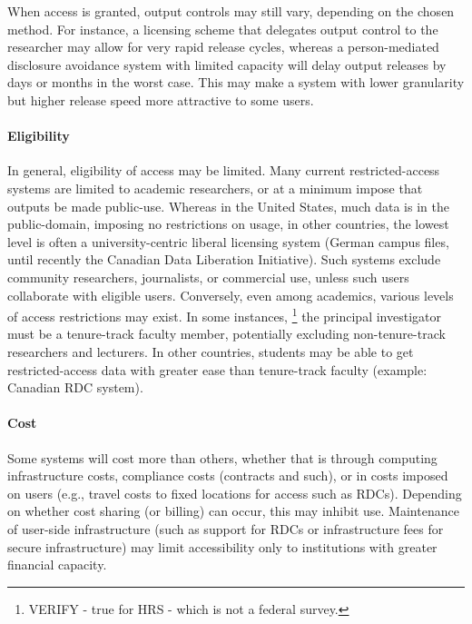 When access is granted, output controls may still vary, depending on the chosen method. For instance, a licensing scheme that delegates output control to the researcher may allow for very rapid release cycles, whereas a person-mediated disclosure avoidance system with limited capacity will delay output releases by days or months in the worst case. This may make a system with lower granularity but higher release speed more attractive to some users. 


\paragraph{Eligibility}

In general, eligibility of access may be limited. Many current restricted-access systems are limited to academic researchers, or at a minimum impose that outputs be made public-use. Whereas in the United States, much data is in the public-domain, imposing no restrictions on usage, in other countries, the lowest level is often a university-centric liberal licensing system (German campus files, until recently the Canadian Data Liberation Initiative). Such systems exclude community researchers, journalists, or commercial use, unless such users collaborate with eligible users. Conversely, even among academics, various levels of access restrictions may exist. In some instances, \footnote{VERIFY - true for HRS - which is not a federal survey.} the principal investigator must be a tenure-track faculty member, potentially excluding non-tenure-track researchers and lecturers. In other countries, students may be able to get restricted-access data with greater ease than tenure-track faculty (example: Canadian RDC system).

\paragraph{Cost}

Some systems will cost more than others, whether that is through computing infrastructure costs, compliance costs (contracts and such), or in costs imposed on users (e.g., travel costs to fixed locations for access such as RDCs). Depending on whether cost sharing (or billing) can occur, this may inhibit use. Maintenance of user-side infrastructure (such as support for RDCs or infrastructure fees for secure infrastructure) may limit accessibility only to institutions with greater financial capacity. 


